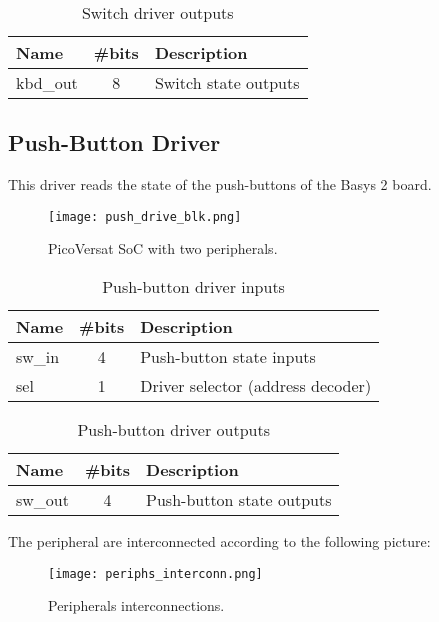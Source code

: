 \begin{table}[ht]
    \centering
    \caption{Switch driver outputs}
    \label{tab:swOut}
    \begin{tabular}{@{}lll@{}}
    \toprule
    Name     & \#bits                & Description          \\ \midrule
    kbd\_out & \multicolumn{1}{c}{8} & Switch state outputs \\ \bottomrule
    \end{tabular}
    \end{table}



\subsection{Push-Button Driver}

This driver reads the state of the push-buttons of the Basys 2 board.



\begin{figure}[!htbp]
    \centerline{\texttt{[image: push\_drive\_blk.png]}}
    \vspace{0cm}\caption{PicoVersat SoC with two peripherals.}
    \label{fig:periphs}
\end{figure}

\begin{table}[!htbp]
    \centering
    \caption{Push-button driver inputs}
    \label{tab:pshIn}
    \begin{tabular}{@{}lcl@{}}
    \toprule
    Name   & \multicolumn{1}{l}{\#bits} & Description                       \\ \midrule
    sw\_in & 4                          & Push-button state inputs              \\
    sel    & 1                          & Driver selector (address decoder) \\ \bottomrule
    \end{tabular}
    \end{table}

\begin{table}[!htbp]
    \centering
    \caption{Push-button driver outputs}
    \label{tab:pshOut}
    \begin{tabular}{@{}lll@{}}
    \toprule
    Name    & \#bits                & Description               \\ \midrule
    sw\_out & \multicolumn{1}{c}{4} & Push-button state outputs \\ \bottomrule
    \end{tabular}
    \end{table}

The peripheral are interconnected according to the following picture:

\begin{figure}[!htbp]
    \centerline{\texttt{[image: periphs\_interconn.png]}}
    \vspace{0cm}\caption{Peripherals interconnections.}
    \label{fig:periphs}
\end{figure}
